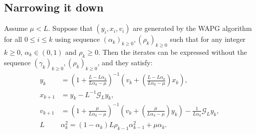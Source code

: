 \documentclass[12pt]{article}
\begin{document}
    \subsection{Narrowing it down}
        \begin{proposition}\label{prop:wapg-intermediate-form}
            Assume $\mu < L$. 
            Suppose that $(y_i, x_i, v_i)$ are generated by the WAPG algorithm for all $0 \le i \le k$ using sequence $(\alpha_k)_{k \ge0}, (\rho_k)_{k \ge0}$ such that for any integer $k\ge 0$, $\alpha_k \in (0, 1)$ and $\rho_k \ge 0$. 
            Then the iterates can be expressed without the sequence $(\gamma_k)_{k \ge0}, (\rho_k)_{k\ge0}$, and they satisfy: 
            \begin{align*}
                y_k &= 
                \left(
                    1 + \frac{L - L\alpha_k}{L\alpha_k - \mu}
                \right)^{-1}
                \left(
                    v_k + 
                    \left(\frac{L - L\alpha_k}{L\alpha_k - \mu} \right) x_k
                \right), 
                \\
                x_{k + 1} &= 
                y_k - L^{-1} \mathcal G_L y_k, 
                \\
                v_{k + 1} &= 
                \left(
                    1 + \frac{\mu}{L \alpha_k - \mu}
                \right)^{-1}
                \left(
                    v_k + 
                    \left(\frac{\mu}{L \alpha_k - \mu}\right) y_k
                \right) - \frac{1}{L\alpha_{k}}\mathcal G_L y_k, 
                \\
                L &\alpha_k^2 = (1 - \alpha_k)L \rho_{k - 1}\alpha_{k - 1}^2 + \mu \alpha_k. 
            \end{align*}
        \end{proposition}
\end{document}
